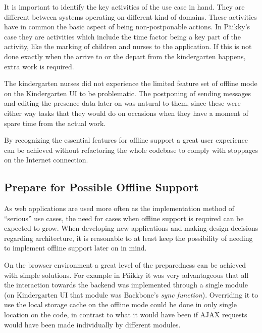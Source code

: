 It is important to identify the key activities of the use case in hand. They are different between systems operating on different kind of domains. These activities have in common the basic aspect of being non-postponable actions. In Päikky's case they are activities which include the time factor being a key part of the activity, like the marking of children and nurses to the application. If this is not done exactly when the arrive to or the depart from the kindergarten happens, extra work is required. 

The kindergarten nurses did not experience the limited feature set of offline mode on the Kindergarten UI to be problematic. The postponing of sending messages and editing the presence data later on was natural to them, since these were either way tasks that they would do on occasions when they have a moment of spare time from the actual work.

By recognizing the essential features for offline support a great user experience can be achieved without refactoring the whole codebase to comply with stoppages on the Internet connection. 





\subsection{Prepare for Possible Offline Support}



As web applications are used more often as the implementation method of ``serious'' use cases, the need for cases when offline support is required can be expected to grow.  When developing new applications and making design decisions regarding architecture, it is reasonable to at least keep the possibility of needing to implement offline support later on in mind. 

On the browser environment a great level of the preparedness can be achieved with simple solutions. For example in Päikky it was very advantageous that all the interaction towards the backend was implemented through a single module (on Kindergarten UI that module was Backbone's \textit{sync function}). Overriding it to use the local storage cache on the offline mode could be done in only single location on the code, in contrast to what it would have been if AJAX requests would have been made individually by different modules. 


